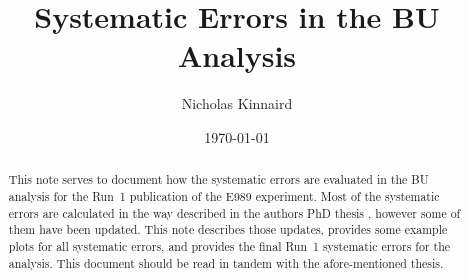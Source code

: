 \documentclass[12pt,letterpaper]{article}
\title{Systematic Errors in the BU Analysis}
\author{Nicholas Kinnaird}
\date{\today}
\begin{document}
\maketitle

\begin{abstract}
	This note serves to document how the systematic errors are evaluated in the BU analysis for the Run~1 publication of the E989 experiment. Most of the systematic errors are calculated in the way described in the authors PhD thesis \cite{phdthesis:2020Kinnaird}, however some of them have been updated. This note describes those updates, provides some example plots for all systematic errors, and provides the final Run~1 systematic errors for the analysis. This document should be read in tandem with the afore-mentioned thesis.
\end{abstract}















\printbibliography

\end{document}

